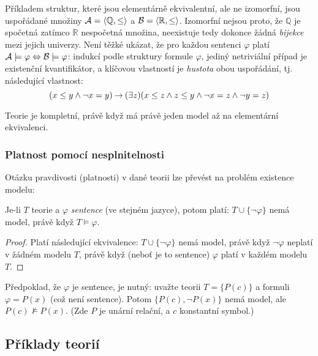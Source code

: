 \begin{example}\label{example:elementary-equivalence-of-orders-R-Q}
    Příkladem struktur, které jsou elementárně ekvivalentní, ale ne izomorfní, jsou uspořádané množiny $\mathcal{A}=\langle\mathbb Q,\leq\rangle$ a $\mathcal{B}=\langle\mathbb R,\leq\rangle$. Izomorfní nejsou proto, že $\mathbb Q$ je spočetná zatímco $\mathbb R$ nespočetná množina, neexistuje tedy dokonce žádná \emph{bijekce} mezi jejich univerzy. Není těžké ukázat, že pro každou sentenci $\varphi$ platí $\mathcal{A}\models\varphi\Leftrightarrow\mathcal{B}\models\varphi$: indukcí podle struktury formule $\varphi$, jediný netriviální případ je existenční kvantifikátor, a klíčovou vlastností je \emph{hustota} obou uspořádání, tj. následující vlastnost:
    $$
    (x\leq y\land \neg x=y)\mathbin{\rightarrow}(\exists z)(x\leq z\land z\leq y\land \neg x=z\land\neg y=z)
    $$

\end{example}
\begin{observation}
    Teorie je kompletní, právě když má právě jeden model až na elementární ekvivalenci.    
\end{observation}



\subsubsection{Platnost pomocí nesplnitelnosti}

Otázku pravdivosti (platnosti) v dané teorii lze převést na problém existence modelu:
\begin{proposition}
    Je-li $T$ teorie a $\varphi$ \emph{sentence} (ve stejném jazyce), potom platí: $T\cup\{\neg\varphi\}$ nemá model, právě když $T\models\varphi$.
\end{proposition}
\begin{proof}
    Platí následující ekvivalence: $T\cup\{\neg\varphi\}$ nemá model, právě když $\neg\varphi$ neplatí v žádném modelu $T$, právě když (neboť je to sentence) $\varphi$ platí v každém modelu $T$. 
\end{proof}

Předpoklad, že $\varphi$ je sentence, je nutný: uvažte teorii $T=\{P(c)\}$ a formuli $\varphi=P(x)$ (což není sentence). Potom $\{P(c),\neg P(x)\}$ nemá model, ale $P(c)\not\models P(x)$. (Zde $P$ je unární relační, a $c$ konstantní symbol.)


\subsection{Příklady teorií}


